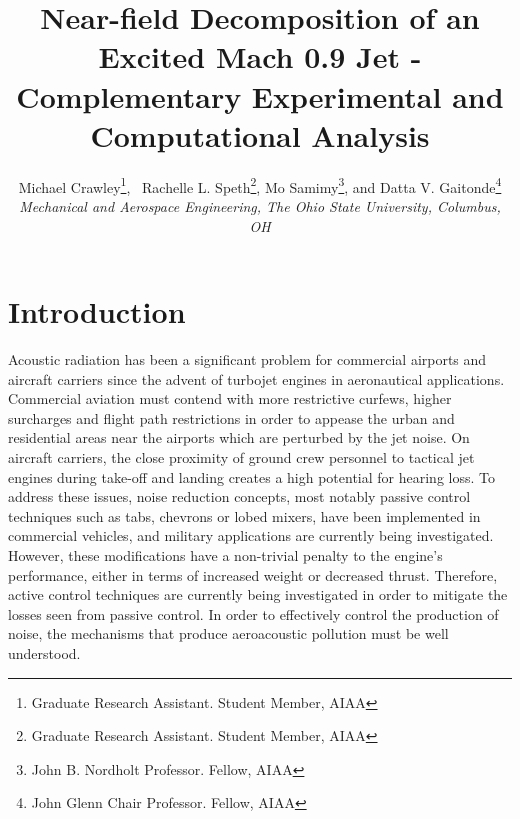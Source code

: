 \documentclass[english]{aiaa-tc}
\begin{document}
\title{Near-field Decomposition of an Excited Mach 0.9 Jet - Complementary Experimental and Computational Analysis}


\author{Michael Crawley\thanks{Graduate Research Assistant. Student Member, AIAA}, \
Rachelle L. Speth\thanks{Graduate Research Assistant. Student Member, AIAA},
 Mo Samimy\thanks{John B. Nordholt Professor. Fellow, AIAA},
 and Datta V. Gaitonde\thanks{John Glenn Chair Professor. Fellow, AIAA}
\\\normalsize\itshape Mechanical and Aerospace Engineering, The Ohio State University, Columbus, OH \\}


\maketitle

\section{Introduction}

 Acoustic radiation has been a significant problem for commercial airports and aircraft carriers since the advent of turbojet engines in aeronautical applications. Commercial aviation must contend with more restrictive curfews, higher surcharges and flight path restrictions in order to appease the urban and residential areas near the airports which are perturbed by the jet noise. On aircraft carriers, the close proximity of ground crew personnel to tactical jet engines during take-off and landing creates a high potential for hearing loss. To address these issues, noise reduction concepts, most notably passive control techniques such as tabs, chevrons or lobed mixers, have been implemented in commercial vehicles, and military applications are currently being investigated. However, these modifications have a non-trivial penalty to the engine's performance, either in terms of increased weight or decreased thrust. Therefore, active control techniques are currently being investigated in order to mitigate the losses seen from passive control. In order to effectively control the production of noise, the mechanisms that produce aeroacoustic pollution  must be well understood. 
\end{document}
